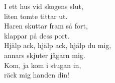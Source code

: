 \vspace{10pt}
I ett hus vid skogens slut,\\
liten tomte tittar ut.\\
Haren skuttar fram så fort,\\
klappar på dess port.\\
Hjälp ack, hjälp ack, hjälp du mig,\\
annars skjuter jägarn mig.\\
Kom, ja kom i stugan in,\\
räck mig handen din!